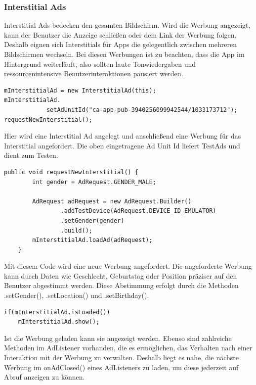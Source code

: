 \documentclass[FIPLY_base.tex]{subfiles}
\begin{document}
\subsubsection{Interstitial Ads}
Interstitial Ads bedecken den gesamten Bildschirm. Wird die Werbung angezeigt, kann der Benutzer die Anzeige schließen oder dem Link der Werbung folgen.
Deshalb eignen sich Interstitials für Apps die gelegentlich zwischen mehreren Bildschirmen wechseln.
Bei diesen Werbungen ist zu beachten, dass die App im Hintergrund weiterläuft, also sollten laute Tonwiedergaben und ressourcenintensive Benutzerinteraktionen pausiert werden. 
\ \\
\begin{lstlisting}
mInterstitialAd = new InterstitialAd(this);
mInterstitialAd.
       		setAdUnitId("ca-app-pub-3940256099942544/1033173712");
requestNewInterstitial();
\end{lstlisting}
Hier wird eine Interstitial Ad angelegt und anschließend eine Werbung für das Interstitial angefordert. 
Die oben eingetragene Ad Unit Id liefert TestAds und dient zum Testen.
\ \\
\begin{lstlisting}
public void requestNewInterstitial() {
        int gender = AdRequest.GENDER_MALE;
        
        AdRequest adRequest = new AdRequest.Builder()
                .addTestDevice(AdRequest.DEVICE_ID_EMULATOR)
                .setGender(gender)
                .build();
        mInterstitialAd.loadAd(adRequest);
    }
\end{lstlisting}
Mit diesem Code wird eine neue Werbung angefordert. Die angeforderte Werbung kann durch Daten wie Geschlecht, Geburtstag oder Position präziser auf den Benutzer abgestimmt werden.
Diese Abstimmung erfolgt durch die Methoden .setGender(), .setLocation() und .setBirthday().	
\ \\
\begin{lstlisting}
if(mInterstitialAd.isLoaded()) 
    mInterstitialAd.show();
\end{lstlisting}
Ist die Werbung geladen kann sie angezeigt werden.
Ebenso sind zahlreiche Methoden im AdListener vorhanden, die es ermöglichen, das Verhalten nach einer Interaktion mit der Werbung zu verwalten.
Deshalb liegt es nahe, die nächste Werbung im onAdClosed() eines AdListeners zu laden, um diese jederzeit auf Abruf anzeigen zu können.
\end{document}
